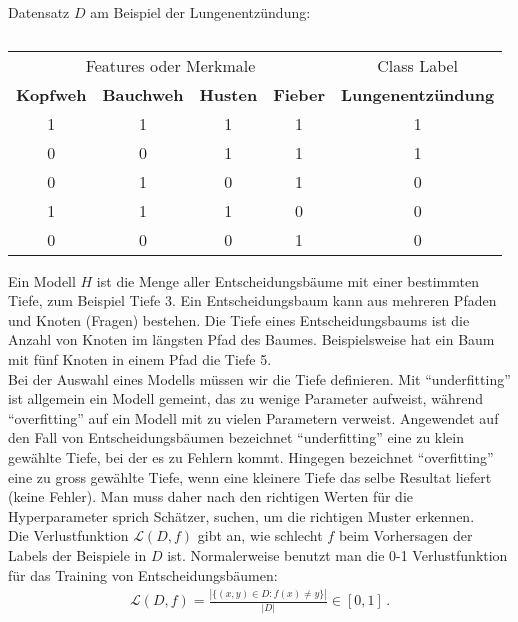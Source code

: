 Datensatz $D$ am Beispiel der Lungenentz\"undung:

\begin{table}[h]
\centering
\begin{tabular}{c|c|c|c||c}
\multicolumn{4}{c}{Features oder Merkmale} & Class Label                                                \\ 
\textbf{Kopfweh} & \textbf{Bauchweh} & \textbf{Husten} & \textbf{Fieber} & \textbf{Lungenentz\"undung}  \\ \hline
1                & 1                 & 1               & 1               & 1                            \\
0                & 0                 & 1               & 1               & 1                            \\
0                & 1                 & 0               & 1               & 0                            \\
1                & 1                 & 1               & 0               & 0                            \\
0                & 0                 & 0               & 1               & 0                 
\end{tabular}
\caption{}
\label{tab:vl11-1}
\end{table}

Ein Modell $H$ ist die Menge aller Entscheidungsb\"aume mit einer bestimmten Tiefe, zum Beispiel Tiefe 3. Ein Entscheidungsbaum kann aus mehreren Pfaden und Knoten (Fragen) bestehen. Die Tiefe eines Entscheidungsbaums ist die Anzahl von Knoten im l\"angsten Pfad des Baumes. Beispielsweise hat ein Baum mit f\"unf Knoten in einem Pfad die Tiefe 5.\\[0.3cm]
Bei der Auswahl eines Modells m\"ussen wir die Tiefe definieren. Mit ``underfitting'' ist allgemein ein Modell gemeint, das zu wenige Parameter aufweist, während ``overfitting'' auf ein Modell mit zu vielen Parametern verweist. Angewendet auf den Fall von Entscheidungsb\"aumen bezeichnet ``underfitting'' eine zu klein gew\"ahlte Tiefe, bei der es zu Fehlern kommt. Hingegen bezeichnet ``overfitting'' eine zu gross gew\"ahlte Tiefe, wenn eine kleinere Tiefe das selbe Resultat liefert (keine Fehler). Man muss daher nach den richtigen Werten f\"ur die Hyperparameter sprich Sch\"atzer, suchen, um die richtigen Muster erkennen.\\[0.3cm]
Die Verlustfunktion $\mathcal{L}(D,f)$ gibt an, wie schlecht $f$ beim Vorhersagen der Labels der Beispiele in $D$ ist. Normalerweise benutzt man die 0-1 Verlustfunktion für das Training von Entscheidungsbäumen:
\begin{align}
\mathcal{L}(D,f) = \frac{| \{ (x,y) \in D: f(x) \neq y \} |}{ | D | } \in \left[ 0,1 \right]\,.
\label{eq:vl11-1}
\end{align}

